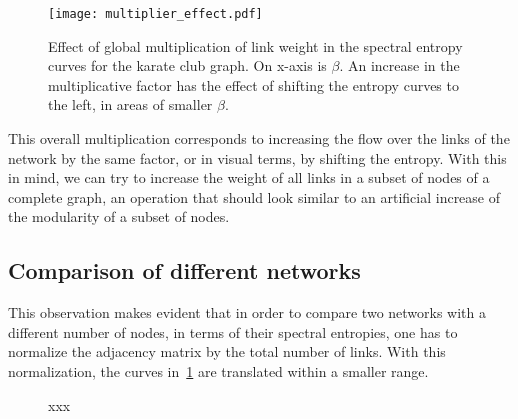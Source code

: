 \documentclass[a4paper]{article}
\begin{document}
\begin{figure}[htb]
\centering
\texttt{[image: multiplier\_effect.pdf]}
\caption{Effect of global multiplication of link weight in the spectral entropy curves for the karate club graph. On x-axis is $\beta$. An increase in the multiplicative factor has the effect of shifting the entropy curves to the left, in areas of smaller $\beta$.}
\label{fig:entropy_curves_unnormalized}
\end{figure}
This overall multiplication corresponds to increasing the flow over the links of the network by the same factor, or in visual terms, by shifting the entropy.
With this in mind, we can try to increase the weight of all links in a subset of nodes of a complete graph, an operation that should look similar to an artificial increase of the modularity of a subset of nodes.

\subsection{Comparison of different networks}
This observation makes evident that in order to compare two networks with a different number of nodes, in terms of their spectral entropies, one has to normalize the adjacency matrix by the total number of links. With this normalization, the curves in~\ref{fig:entropy_curves_unnormalized} are translated within a smaller range.

\begin{figure}[htb]
\centering
\caption{xxx}
\label{fig:entropy_curves_normalized}
\end{figure}

\begin{figure}

\end{figure}
\end{document}
